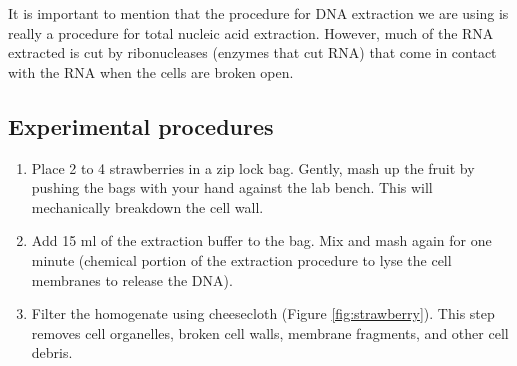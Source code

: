 \documentclass[]{book}
\providecommand{\tightlist}{%
  \setlength{\itemsep}{0pt}\setlength{\parskip}{0pt}}
\theoremstyle{definition}
\theoremstyle{definition}
\theoremstyle{definition}
\theoremstyle{remark}
\begin{document}
It is important to mention that the procedure for DNA extraction we are
using is really a procedure for total nucleic acid extraction. However,
much of the RNA extracted is cut by ribonucleases (enzymes that cut RNA)
that come in contact with the RNA when the cells are broken open.

\subsection{Experimental procedures}\label{experimental-procedures-6}

\begin{enumerate}
\def\labelenumi{\arabic{enumi}.}
\tightlist
\item
  Place 2 to 4 strawberries in a zip lock bag. Gently, mash up the fruit
  by pushing the bags with your hand against the lab bench. This will
  mechanically breakdown the cell wall.
\item
  Add 15 ml of the extraction buffer to the bag. Mix and mash again for
  one minute (chemical portion of the extraction procedure to lyse the
  cell membranes to release the DNA).
\item
  Filter the homogenate using cheesecloth (Figure \ref{fig:strawberry}).
  This step removes cell organelles, broken cell walls, membrane
  fragments, and other cell debris.
\end{enumerate}
\end{document}
